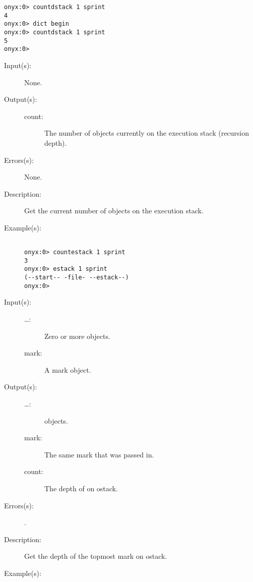 \begin{description}
\begin{description}
\begin{verbatim}
onyx:0> countdstack 1 sprint
4
onyx:0> dict begin
onyx:0> countdstack 1 sprint
5
onyx:0>
		\end{verbatim}
	\end{description}
\label{systemdict:countestack}
\item[{\onyxop{--}{countestack}{count}}: ]
	\begin{description}\item[]
	\item[Input(s): ] None.
	\item[Output(s): ]
		\begin{description}\item[]
		\item[count: ]
			The number of objects currently on the execution stack
			(recursion depth).
		\end{description}
	\item[Errors(s): ] None.
	\item[Description: ]
		Get the current number of objects on the execution stack.
	\item[Example(s): ]\begin{verbatim}

onyx:0> countestack 1 sprint
3
onyx:0> estack 1 sprint
(--start-- -file- --estack--)
onyx:0>
		\end{verbatim}
	\end{description}
\label{systemdict:counttomark}
\item[{\onyxop{mark \dots}{counttomark}{mark \dots count}}: ]
	\begin{description}\item[]
	\item[Input(s): ]
		\begin{description}\item[]
		\item[\dots: ]
			Zero or more objects.
		\item[mark: ]
			A mark object.
		\end{description}
	\item[Output(s): ]
		\begin{description}\item[]
		\item[\dots: ]
			 objects.
		\item[mark: ]
			The same mark that was passed in.
		\item[count: ]
			The depth of  on ostack.
		\end{description}
	\item[Errors(s): ]
		\begin{description}\item[]
		\item[.]
		\end{description}
	\item[Description: ]
		Get the depth of the topmost mark on ostack.
	\item[Example(s): ]\begin{verbatim}


\end{verbatim}
\end{description}
\end{description}
